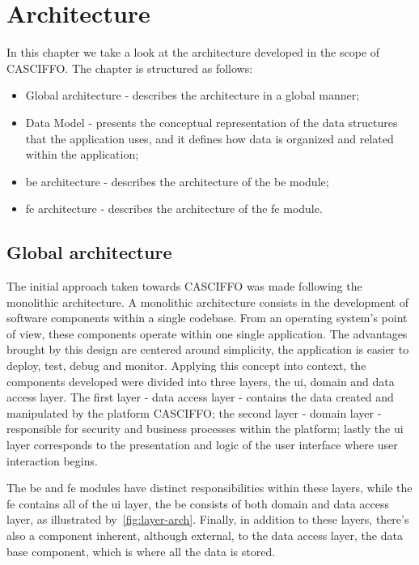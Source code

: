 % 
%
\chapter{Architecture}\label{ch:architecture}
In this chapter we take a look at the architecture developed in the scope of CASCIFFO.
The chapter is structured as follows:
\begin{itemize}
    \item Global architecture - describes the architecture in a global manner;
    \item Data Model - presents the conceptual representation of the data structures that the application uses, and it defines how data is organized and related within the application;
    \item \acrlong{be} architecture - describes the architecture of the \acrlong{be} module;
    \item \acrlong{fe} architecture - describes the architecture of the \acrlong{fe} module.
\end{itemize}


\section{Global architecture}
The initial approach taken towards CASCIFFO was made following the monolithic architecture. A monolithic architecture consists in the development of software components within a single codebase. From an operating system's point of view, these components operate within one single application. The advantages brought by this design are centered around simplicity, the application is easier to deploy, test, debug and monitor. 
Applying this concept into context, the components developed were divided into three layers, the \acrshort{ui}, domain and data access layer. The first layer - data access layer - contains the data created and manipulated by the platform CASCIFFO; the second layer - domain layer - responsible for security and business processes within the platform; lastly the \acrshort{ui} layer corresponds to the presentation and logic of the user interface where user interaction begins.

The \acrlong{be} and \acrlong{fe} modules have distinct responsibilities within these layers, while the \acrshort{fe} contains all of the \acrshort{ui} layer, the \acrshort{be} consists of both domain and data access layer, as illustrated by~\ref{fig:layer-arch}. Finally, in addition to these layers, there's also a component inherent, although external, to the data access layer, the data base component, which is where all the data is stored.

